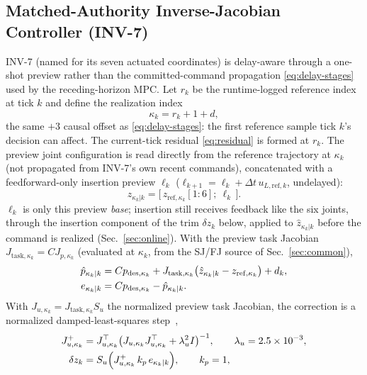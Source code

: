 \documentclass[journal]{IEEEtran}
\begin{document}
\subsection{Matched-Authority Inverse-Jacobian Controller (INV-7)}
\label{sec:inv7}
INV-7 (named for its seven actuated coordinates) is delay-aware through a
one-shot preview rather than the committed-command propagation
\eqref{eq:delay-stages} used by the receding-horizon MPC. Let $r_k$ be the
runtime-logged reference index at tick $k$ and define the realization
index
\begin{equation}
\kappa_k = r_k+1+d,
\label{eq:kappa}
\end{equation}
the same $+3$ causal offset as \eqref{eq:delay-stages}: the first
reference sample tick $k$'s decision can affect. The current-tick residual
\eqref{eq:residual} is formed at $r_k$. The preview joint configuration is
read directly from the reference trajectory at $\kappa_k$ (not propagated
from INV-7's own recent commands), concatenated with a feedforward-only
insertion preview $\ell_k$ ($\ell_{k+1}=\ell_k+\Delta t\,u_{L,\mathrm{ref},k}$,
undelayed):
\begin{equation}
\hat z_{\kappa_k|k} = \big[\,z_{\mathrm{ref},\kappa_k}[1{:}6];\ \ell_k\,\big].
\label{eq:inv7-preview-state}
\end{equation}
$\ell_k$ is only this preview \emph{base}; insertion still receives
feedback like the six joints, through the insertion component of the trim
$\delta z_k$ below, applied to $\hat z_{\kappa_k|k}$ before the command is
realized (Sec.~\ref{sec:online}). With the preview task Jacobian
$J_{\mathrm{task},\kappa_k}=CJ_{p,\kappa_k}$ (evaluated at $\kappa_k$, from
the SJ/FJ source of Sec.~\ref{sec:common}),
\begin{align}
\hat p_{\kappa_k|k} &= C p_{\mathrm{des},\kappa_k} +
J_{\mathrm{task},\kappa_k}\big(\hat z_{\kappa_k|k}-z_{\mathrm{ref},\kappa_k}\big)
+ d_k,
\label{eq:inv7-preview-error}\\
e_{\kappa_k|k} &= C p_{\mathrm{des},\kappa_k} - \hat p_{\kappa_k|k}.
\notag
\end{align}
With $J_{u,\kappa_k}=J_{\mathrm{task},\kappa_k}S_u$ the normalized preview
task Jacobian, the correction is a normalized damped-least-squares
step~\cite{nakamura1986inverse,wampler1986manipulator},
\begin{align}
J_{u,\kappa_k}^{+} &= J_{u,\kappa_k}^{\top}
\big(J_{u,\kappa_k}J_{u,\kappa_k}^{\top}+\lambda_u^2 I\big)^{-1},
\qquad \lambda_u = 2.5\times10^{-3},
\label{eq:inv7-pinv}\\
\delta z_k &= S_u\Big(J_{u,\kappa_k}^{+}\,k_p\,e_{\kappa_k|k}\Big),
\qquad k_p=1,
\notag
\end{align}
\end{document}
